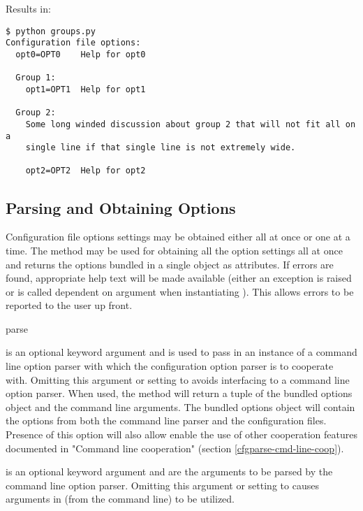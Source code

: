 \documentclass{howto}
\begin{document}
Results in:

\begin{verbatim}
$ python groups.py
Configuration file options:
  opt0=OPT0    Help for opt0

  Group 1:
    opt1=OPT1  Help for opt1

  Group 2:
    Some long winded discussion about group 2 that will not fit all on a
    single line if that single line is not extremely wide.

    opt2=OPT2  Help for opt2
\end{verbatim}

\subsection{Parsing and Obtaining Options\label{cfgparse-parsing}}

Configuration file options settings may be obtained either all at once or one
at a time.  The  method may be used for obtaining all the option
settings all at once and returns the options bundled in a single object as
attributes.  If errors are found, appropriate help text will be made available 
(either an exception is raised or  is called dependent on 
 argument when instantiating ).  This allows 
errors to be reported to the user up front.

  \begin{funcdesc}{parse}{}

     is an optional keyword argument and is used to pass in an
        instance of a command line option parser with which the configuration
        option parser is to cooperate with.  Omitting this argument or 
        setting to  avoids interfacing to a command line option parser.
        When used, the  method will return a tuple of the bundled
        options object and the command line arguments.  The bundled options
        object will contain the options from both the command line parser and
        the configuration files.  Presence of this option will also allow
        enable the use of other cooperation features documented in 
        "Command line cooperation" (section \ref{cfgparse-cmd-line-coop}).
    
     is an optional keyword argument and are the arguments to be
        parsed by the command line option parser.  Omitting this argument or
        setting to  causes arguments in  (from the 
        command line) to be utilized.
  
  \end{funcdesc}
\end{document}
